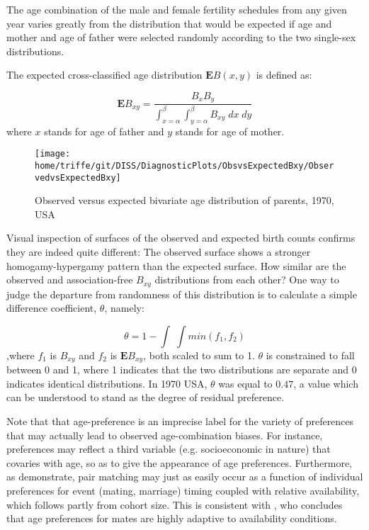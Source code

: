 
The age combination of the male and female fertility schedules from
any given year varies greatly from the distribution that would be expected if
age and mother and age of father were selected randomly according to the two
single-sex distributions.

The expected cross-classified age distribution $\textbf{E}B(x,y)$ is defined as:

\begin{equation}
\textbf{E}B_{xy} = \frac{B_x B_y}{\int _{x = \alpha} ^\beta \int _{y = \alpha}
^\beta B_{xy} \; dx \;dy}
\end{equation}
where $x$ stands for age of father and $y$ stands for age of mother.

\begin{figure}
        \centering  
          \caption{Observed versus expected bivariate age distribution of
          parents, 1970, USA}
          \texttt{[image: home/triffe/git/DISS/DiagnosticPlots/ObsvsExpectedBxy/ObservedvsExpectedBxy]}
          \label{fig:US1970obsexp}
\end{figure}

Visual inspection of surfaces of the observed and expected birth counts
confirms they are indeed quite different: The observed surface shows a stronger
homogamy-hypergamy pattern than the expected surface. How similar are the
observed and association-free $B_{xy}$ distributions from each other? One way to
judge the departure from randomness of this distribution is to calculate a
simple difference coefficient, $\theta$, namely:

\begin{equation}
\theta = 1 - \int \;\int min(f_1, f_2)
\end{equation}
,where $f_1$ is $B_{xy}$ and $f_2$ is $\textbf{E}B_{xy}$, both scaled to sum to
1. $\theta$ is constrained to fall between 0 and 1, where 1 indicates that the
two distributions are separate and 0 indicates identical distributions. In 1970 USA,
$\theta$ was equal to $0.47$, a value which can be understood to stand as the
degree of residual preference.

Note that that age-preference is an imprecise label for the variety
of preferences that may actually lead to observed age-combination biases. For
instance, preferences may reflect a third variable (e.g. socioeconomic
in nature) that covaries with age, so as to give the appearance of age
preferences. Furthermore, as \citet{bergstrom1989effects, bergstrom1994sweden}
demonstrate, pair matching may just as easily occur as a function of individual
preferences for event (mating, marriage) timing coupled with relative
availability, which follows partly from cohort size. This is consistent with
\citet{bhrolchain2001flexibility}, who concludes that age preferences for
mates are highly adaptive to availability conditions.

